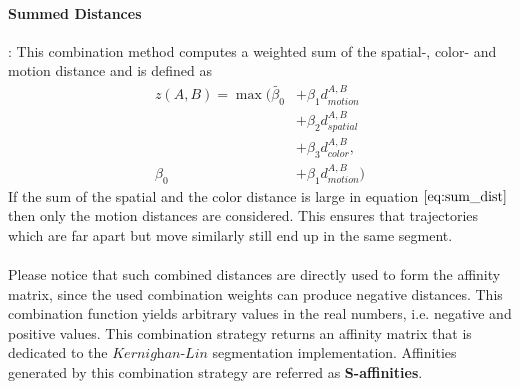 \paragraph{Summed Distances}: This combination method computes a weighted sum of the spatial-, color- and motion distance and is defined as
\begin{equation}
\begin{aligned}
z ( A, B ) = \max (\tilde{\beta_0} & + \beta_1 d_{motion}^{A,B} \\
& + \beta_2 d_{spatial}^{A,B} \\
& + \beta_3 d_{color}^{A,B},\\
\beta_0 & + \beta_1 d_{motion}^{A,B} )
\end{aligned}
\label{eq:sum_dist}
\end{equation}
If the sum of the spatial and the color distance is large in equation $\ref{eq:sum_dist}$ then only the motion distances are considered. This ensures that trajectories which are far apart but move similarly still end up in the same segment. \\ \\
Please notice that such combined distances are directly used to form the affinity matrix, since the used combination weights can produce negative distances. This combination function yields arbitrary values in the real numbers, i.e. negative and positive values. This combination strategy returns an affinity matrix that is dedicated to the $\textit{Kernighan-Lin}$ segmentation implementation. Affinities generated by this combination strategy are referred as \textbf{S-affinities}.
 
